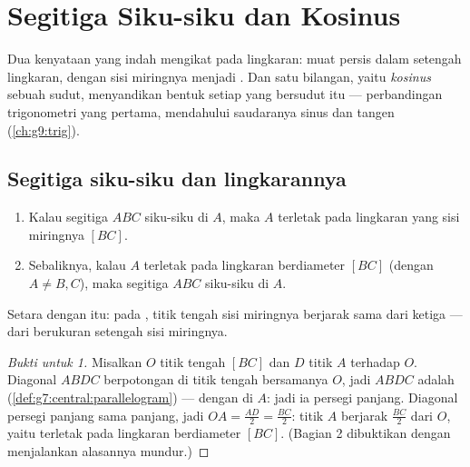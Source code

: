 \chapter{Segitiga Siku-siku dan Kosinus}\label{ch:g8:cosine}

Dua kenyataan yang indah mengikat  pada lingkaran:
 muat persis dalam setengah lingkaran, dengan sisi
miringnya menjadi . Dan satu bilangan, yaitu \emph{kosinus}
sebuah sudut, menyandikan bentuk setiap  yang
bersudut itu --- perbandingan trigonometri yang pertama, mendahului
saudaranya sinus dan tangen (\cref{ch:g9:trig}).

\section{Segitiga siku-siku dan lingkarannya}

\begin{theorem}\label{thm:g8:cosine:circle}
\begin{enumerate}
  \item Kalau segitiga $ABC$ siku-siku di $A$, maka $A$ terletak pada
        lingkaran yang  sisi miringnya $[BC]$.
  \item Sebaliknya, kalau $A$ terletak pada lingkaran berdiameter
        $[BC]$ (dengan $A \neq B, C$), maka segitiga $ABC$ siku-siku
        di $A$.
\end{enumerate}
Setara dengan itu: pada , titik tengah sisi miringnya
berjarak sama dari ketiga  ---  dari  berukuran setengah sisi miringnya.
\end{theorem}

\begin{proof}[Bukti untuk 1]
Misalkan $O$ titik tengah $[BC]$ dan $D$ titik  $A$ terhadap
$O$. Diagonal $ABDC$ berpotongan di titik tengah bersamanya $O$, jadi
$ABDC$ adalah  (\cref{def:g7:central:parallelogram}) ---
dengan  di $A$: jadi ia persegi panjang. Diagonal
persegi panjang sama panjang, jadi $OA = \frac{AD}{2} = \frac{BC}{2}$:
titik $A$ berjarak $\frac{BC}{2}$ dari $O$, yaitu terletak pada
lingkaran berdiameter $[BC]$. (Bagian 2 dibuktikan dengan menjalankan
alasannya mundur.)
\end{proof}

